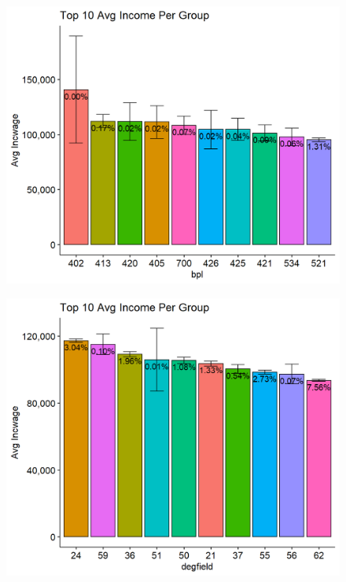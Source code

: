 \documentclass[11pt, letter,twocolumn]{article}
\begin{document}
\begin{figure}[ht]
	\centering
	\label{fig:unnamed-chunk-7-7}
	\includegraphics[width=0.9\linewidth]{imgs/preliminary_analysis/unnamed-chunk-7-7}
\end{figure}
\begin{figure}[ht]
	\centering

	\label{fig:unnamed-chunk-7-11}
	\includegraphics[width=0.9\linewidth]{imgs/preliminary_analysis/unnamed-chunk-7-11}
\end{figure}
\end{document}
